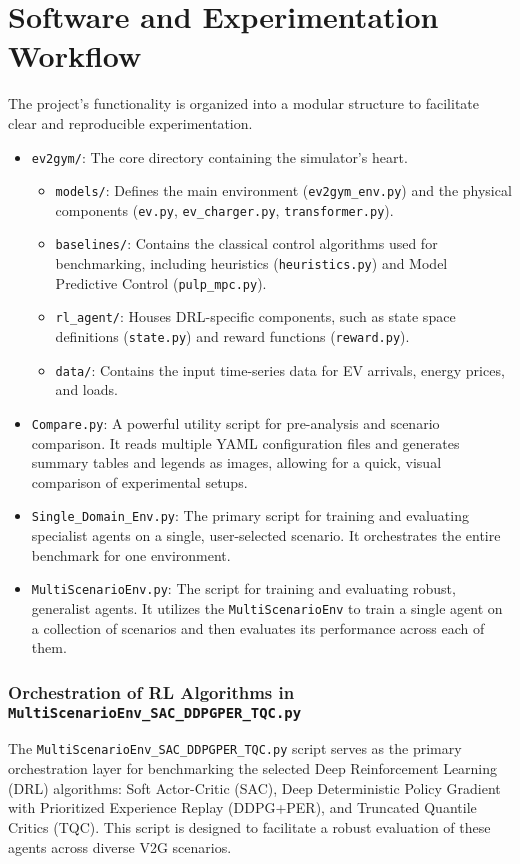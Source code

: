 \section{Software and Experimentation Workflow}
The project's functionality is organized into a modular structure to facilitate clear and reproducible experimentation.
\begin{itemize}
    \item \texttt{ev2gym/}: The core directory containing the simulator's heart.
    \begin{itemize}
        \item \texttt{models/}: Defines the main environment (\texttt{ev2gym\_env.py}) and the physical components (\texttt{ev.py}, \texttt{ev\_charger.py}, \texttt{transformer.py}).
        \item \texttt{baselines/}: Contains the classical control algorithms used for benchmarking, including heuristics (\texttt{heuristics.py}) and Model Predictive Control (\texttt{pulp\_mpc.py}).
        \item \texttt{rl\_agent/}: Houses DRL-specific components, such as state space definitions (\texttt{state.py}) and reward functions (\texttt{reward.py}).
        \item \texttt{data/}: Contains the input time-series data for EV arrivals, energy prices, and loads.
    \end{itemize}
    \item \texttt{Compare.py}: A powerful utility script for pre-analysis and scenario comparison. It reads multiple YAML configuration files and generates summary tables and legends as images, allowing for a quick, visual comparison of experimental setups.
    \item \texttt{Single\_Domain\_Env.py}: The primary script for training and evaluating specialist agents on a single, user-selected scenario. It orchestrates the entire benchmark for one environment.
    \item \texttt{MultiScenarioEnv.py}: The script for training and evaluating robust, generalist agents. It utilizes the \texttt{MultiScenarioEnv} to train a single agent on a collection of scenarios and then evaluates its performance across each of them.
\end{itemize}

\subsubsection{Orchestration of RL Algorithms in \texttt{MultiScenarioEnv\_SAC\_DDPGPER\_TQC.py}}
The \texttt{MultiScenarioEnv\_SAC\_DDPGPER\_TQC.py} script serves as the primary orchestration layer for benchmarking the selected Deep Reinforcement Learning (DRL) algorithms: Soft Actor-Critic (SAC), Deep Deterministic Policy Gradient with Prioritized Experience Replay (DDPG+PER), and Truncated Quantile Critics (TQC). This script is designed to facilitate a robust evaluation of these agents across diverse V2G scenarios.

